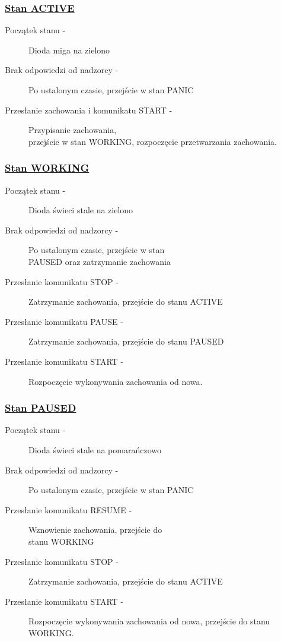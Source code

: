 \subsubsection{\underline{Stan ACTIVE}}

\begin{description}
    \item[Początek stanu -]Dioda miga na zielono
    \item[Brak odpowiedzi od nadzorcy -]Po ustalonym czasie, przejście w stan PANIC
    \item[Przesłanie zachowania i komunikatu START -]Przypisanie zachowania,\\przejście w stan WORKING, rozpoczęcie przetwarzania zachowania.
\end{description}

\subsubsection{\underline{Stan WORKING}}

\begin{description}
    \item[Początek stanu -]Dioda świeci stale na zielono
    \item[Brak odpowiedzi od nadzorcy -]Po ustalonym czasie, przejście w stan\\PAUSED oraz zatrzymanie zachowania
    \item[Przesłanie komunikatu STOP -]Zatrzymanie zachowania, przejście do stanu ACTIVE
    \item[Przesłanie komunikatu PAUSE -]Zatrzymanie zachowania, przejście do stanu PAUSED
    \item[Przesłanie komunikatu START -]Rozpoczęcie wykonywania zachowania od nowa.
\end{description}

\subsubsection{\underline{Stan PAUSED}}

\begin{description}
    \item[Początek stanu -]Dioda świeci stale na pomarańczowo
    \item[Brak odpowiedzi od nadzorcy -]Po ustalonym czasie, przejście w stan PANIC
    \item[Przesłanie komunikatu RESUME -]Wznowienie zachowania, przejście do\\stanu WORKING
    \item[Przesłanie komunikatu STOP -]Zatrzymanie zachowania, przejście do stanu ACTIVE
    \item[Przesłanie komunikatu START -]Rozpoczęcie wykonywania zachowania od nowa, przejście do stanu WORKING.
\end{description}

